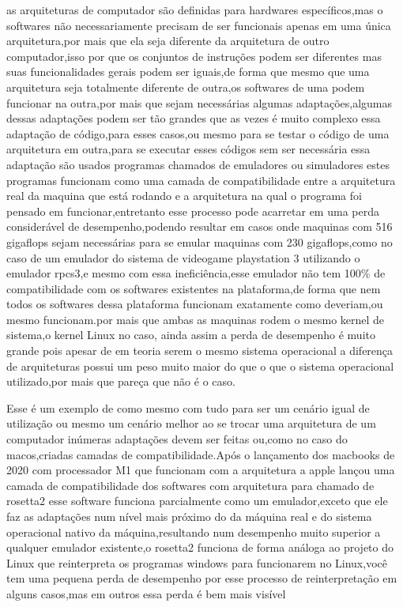 \documentclass[
	12pt,				%
	openright,			%
	oneside,			%
	a4paper,			%
	english,			%
	french,				%
	spanish,			%
	brazil,				%
	]{abntex2}
\begin{document}
as arquiteturas de computador são definidas para hardwares específicos,mas o softwares não necessariamente precisam de ser funcionais apenas em uma única arquitetura,por mais que ela seja diferente da arquitetura de outro computador,isso por que os conjuntos de instruções podem ser diferentes mas suas funcionalidades gerais podem ser iguais,de forma que mesmo que uma arquitetura seja totalmente diferente de outra,os softwares de uma podem funcionar na outra,por mais que sejam necessárias algumas adaptações,algumas dessas adaptações podem ser tão grandes que as vezes é muito complexo essa adaptação de código,para esses casos,ou mesmo para se testar o código de uma arquitetura em outra,para se executar esses códigos sem ser necessária essa adaptação são usados programas chamados de emuladores ou simuladores estes programas funcionam como uma camada de compatibilidade entre a arquitetura real da maquina que está rodando e a arquitetura na qual o programa foi pensado em funcionar,entretanto esse processo pode acarretar em uma perda considerável de desempenho,podendo resultar em casos onde maquinas com  516 gigaflops sejam necessárias para se emular maquinas com 230 gigaflops,como no caso de um emulador do sistema de videogame playstation 3 utilizando o emulador rpcs3,e mesmo com essa ineficiência,esse emulador não tem 100\% de compatibilidade com os softwares existentes na plataforma,de forma que nem todos os softwares dessa plataforma funcionam exatamente como deveriam,ou mesmo funcionam.por mais que ambas as maquinas rodem o mesmo kernel de sistema,o kernel Linux no caso, ainda assim a perda de desempenho é muito grande pois apesar de em teoria serem o mesmo sistema operacional a diferença de arquiteturas possui um peso muito maior do que o que o sistema operacional utilizado,por mais que pareça que não é o caso.\newline

Esse é um exemplo de como mesmo com tudo para ser um cenário igual de utilização ou mesmo um cenário melhor ao se trocar uma arquitetura de um computador inúmeras adaptações devem ser feitas ou,como no caso do macos,criadas camadas de compatibilidade.Após o lançamento dos macbooks de 2020 com processador M1 que funcionam com a arquitetura  a apple lançou uma camada de compatibilidade dos softwares com arquitetura  para  chamado de rosetta2 esse software funciona parcialmente como um emulador,exceto que ele faz as adaptações num nível mais próximo do da máquina real e do sistema operacional nativo da máquina,resultando num desempenho muito superior a qualquer emulador existente,o rosetta2 funciona de forma análoga ao projeto  do Linux que reinterpreta os programas windows para funcionarem no Linux,você tem uma pequena perda de desempenho por esse processo de reinterpretação em alguns casos,mas em outros essa perda é bem mais visível\newline
\end{document}
